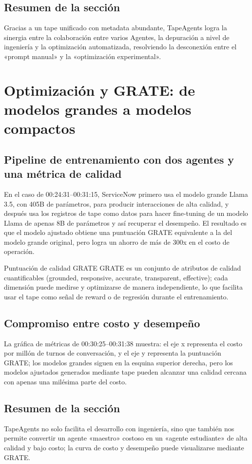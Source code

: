 \documentclass[a4paper]{article}
\begin{document}
\subsection{Resumen de la sección}
Gracias a un tape unificado con metadata abundante, TapeAgents logra la sinergia entre la colaboración entre varios Agentes, la depuración a nivel de ingeniería y la optimización automatizada, resolviendo la desconexión entre el «prompt manual» y la «optimización experimental».

\section{Optimización y GRATE: de modelos grandes a modelos compactos}
\subsection{Pipeline de entrenamiento con dos agentes y una métrica de calidad}
En el caso de 00:24:31--00:31:15, ServiceNow primero usa el modelo grande Llama 3.5, con 405B de parámetros, para producir interacciones de alta calidad, y después usa los registros de tape como datos para hacer fine-tuning de un modelo Llama de apenas 8B de parámetros y así recuperar el desempeño. El resultado es que el modelo ajustado obtiene una puntuación GRATE equivalente a la del modelo grande original, pero logra un ahorro de más de 300x en el costo de operación.

\begin{knowledgebox}{Puntuación de calidad GRATE}
GRATE es un conjunto de atributos de calidad cuantificables (grounded, responsive, accurate, transparent, effective); cada dimensión puede medirse y optimizarse de manera independiente, lo que facilita usar el tape como señal de reward o de regresión durante el entrenamiento.
\end{knowledgebox}

\subsection{Compromiso entre costo y desempeño}
La gráfica de métricas de 00:30:25--00:31:38 muestra: el eje x representa el costo por millón de turnos de conversación, y el eje y representa la puntuación GRATE; los modelos grandes siguen en la esquina superior derecha, pero los modelos ajustados generados mediante tape pueden alcanzar una calidad cercana con apenas una milésima parte del costo.

\subsection{Resumen de la sección}
TapeAgents no solo facilita el desarrollo con ingeniería, sino que también nos permite convertir un agente «maestro» costoso en un «agente estudiante» de alta calidad y bajo costo; la curva de costo y desempeño puede visualizarse mediante GRATE.
\end{document}
